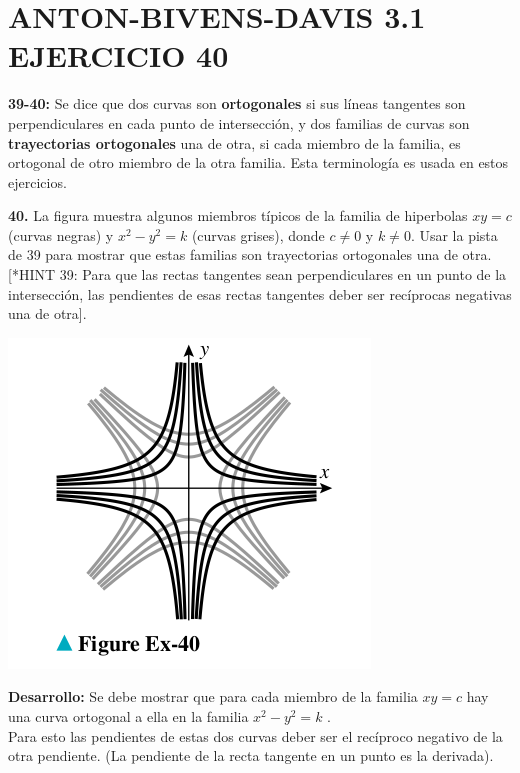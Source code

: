 \chapter*{ ANTON-BIVENS-DAVIS 3.1 EJERCICIO 40}

\textbf{39-40:} Se dice que dos curvas son \textbf{ortogonales} si sus líneas tangentes son perpendiculares en cada punto de intersección, y dos familias de curvas son \textbf{trayectorias ortogonales} una de otra, si cada miembro de la familia, es ortogonal de otro miembro de la otra familia. Esta terminología es usada en estos ejercicios. \newline

\textbf{40.} La figura muestra algunos miembros típicos de la familia de hiperbolas $xy = c$ (curvas negras) y $x^{2} - y^{2} = k$ (curvas grises), donde $ c \neq 0$ y $ k \neq 0$. Usar la pista de 39 para mostrar que estas familias son trayectorias ortogonales una de otra. [*HINT 39: Para que las rectas tangentes sean perpendiculares en un punto de la intersección, las pendientes de esas rectas tangentes deber ser recíprocas negativas una de otra]. \\
\newline
\begin{center}
    \includegraphics[height = 0.25\textheight]{recursos/Grafo40.png}\par
\end{center}
\newline
\textbf{Desarrollo:}\newline
Se debe mostrar que para cada miembro de la familia $xy = c$ hay una curva ortogonal a ella en la familia  $x^{2} - y^{2} = k$ . \\
Para esto las pendientes de estas dos curvas deber ser el recíproco negativo de la otra pendiente. (La pendiente de la recta tangente en un punto es la derivada).\\
